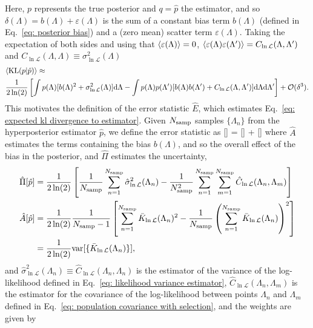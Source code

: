 Here, $p$ represents the true posterior and $q=\hat{p}$ the estimator, and so $\delta(\Lambda) = b(\Lambda) + \varepsilon(\Lambda)$ is the sum of a constant bias term $b(\Lambda)$ (defined in Eq.~\ref{eq: posterior bias}) and a (zero mean) scatter term $\varepsilon(\Lambda)$. Taking the expectation of both sides and using that $\langle \varepsilon(\Lambda)\rangle = 0$, $\langle \varepsilon(\Lambda)\varepsilon(\Lambda')\rangle = C_{\ln\mathcal{L}}(\Lambda, \Lambda')$ and $C_{\ln\mathcal{L}}(\Lambda, \Lambda) \equiv \sigma^2_{\ln\mathcal{L}}(\Lambda)$
\begin{align}
&\langle {\rm KL}(p|\hat{p})\rangle \approx \\ &\frac{1}{2\ln(2)} \left[\int p(\Lambda)[b(\Lambda)^2 + \sigma^2_{\ln\mathcal{L}}(\Lambda)]\dd\Lambda - \int p(\Lambda)p(\Lambda')[b(\Lambda)b(\Lambda') + C_{\ln\mathcal{L}}(\Lambda,  \Lambda')]\dd\Lambda\dd\Lambda'\right] + \mathcal{O}(\delta^3). \nonumber
\label{eq: expected kl divergence to estimator}
\end{align}
This motivates the definition of the error statistic $\hat{E}$, which estimates Eq.~\ref{eq: expected kl divergence to estimator}. Given $N_{\rm samp}$ samples $\{\Lambda_n\}$ from the hyperposterior estimator $\hat{p}$, we define the error statistic as 
\beq
{}[] = [] + \hat{\Pi}[]
\label{eq: error statistic}
\eeq
where $\hat{A}$ estimates the terms containing the bias $b(\Lambda)$, and so the overall effect of the bias in the posterior, and $\hat{\Pi}$ estimates the uncertainty, 
\begin{align}
    \hat{\Pi}[\hat{p}] &= \frac{1}{2\ln(2)}\left[\frac{1}{N_{\rm samp}}\sum_{n=1}^{N_{\rm samp}}\hat{\sigma}^2_{\ln\mathcal{L}}(\Lambda_n) - \frac{1}{N_{\rm samp}^2}\sum_{n=1}^{N_{\rm samp}}\sum_{m=1}^{N_{\rm samp}}\hat{C}_{\ln\mathcal{L}}(\Lambda_n, \Lambda_m)\right]
    \label{eq: precision statistic} \\
    \hat{A}[\hat{p}] &= \frac{1}{2\ln(2)}\frac{1}{N_{\rm samp}-1}\left[\sum_{n=1}^{N_{\rm samp}}\bar{K}_{\ln\mathcal{L}}(\Lambda_n)^2 - \frac{1}{N_{\rm samp}}\left(\sum_{n=1}^{N_{\rm samp}}\bar{K}_{\ln\mathcal{L}}(\Lambda_n)\right)^2\right] \label{eq: accuracy statistic} \\ &= \frac{1}{2\ln(2)}{\rm var}[\{\bar{K}_{\ln\mathcal{L}}(\Lambda_n)\}],
    \nonumber
\end{align}
and $\hat{\sigma}^2_{\ln\mathcal{L}}(\Lambda_n)\equiv\hat{C}_{\ln\mathcal{L}}(\Lambda_n, \Lambda_n)$ is the estimator of the variance of the log-likelihood defined in Eq.~\ref{eq: likelihood variance estimator}, $\hat{C}_{\ln\mathcal{L}}(\Lambda_n, \Lambda_m)$ is the estimator for the covariance of the log-likelihood between points $\Lambda_n$ and $\Lambda_m$ defined in Eq.~\ref{eq: population covariance with selection}, and the weights are given by
